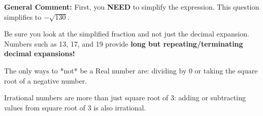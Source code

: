 \documentclass{extbook}[14pt]
\begin{document}
\begin{enumerate}
{\textbf{General Comment:} First, you \textbf{NEED} to simplify the expression. This question simplifies to $-\sqrt{130}$. 
 
 Be sure you look at the simplified fraction and not just the decimal expansion. Numbers such as 13, 17, and 19 provide \textbf{long but repeating/terminating decimal expansions!} 
 
 The only ways to *not* be a Real number are: dividing by 0 or taking the square root of a negative number. 
 
 Irrational numbers are more than just square root of 3: adding or subtracting values from square root of 3 is also irrational.
}
\end{enumerate}
\end{document}
